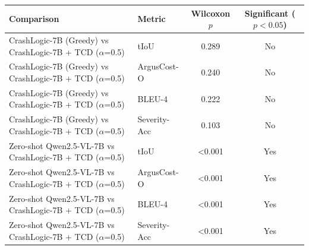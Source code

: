 \begin{tabular}{l l c c}
\toprule
Comparison & Metric & Wilcoxon $p$ & Significant ($p<0.05$) \\
\midrule
CrashLogic-7B (Greedy) vs CrashLogic-7B + TCD ($\alpha$=0.5) & tIoU & 0.289 & No \\
CrashLogic-7B (Greedy) vs CrashLogic-7B + TCD ($\alpha$=0.5) & ArgusCost-O & 0.240 & No \\
CrashLogic-7B (Greedy) vs CrashLogic-7B + TCD ($\alpha$=0.5) & BLEU-4 & 0.222 & No \\
CrashLogic-7B (Greedy) vs CrashLogic-7B + TCD ($\alpha$=0.5) & Severity-Acc & 0.103 & No \\
Zero-shot Qwen2.5-VL-7B vs CrashLogic-7B + TCD ($\alpha$=0.5) & tIoU & <0.001 & Yes \\
Zero-shot Qwen2.5-VL-7B vs CrashLogic-7B + TCD ($\alpha$=0.5) & ArgusCost-O & <0.001 & Yes \\
Zero-shot Qwen2.5-VL-7B vs CrashLogic-7B + TCD ($\alpha$=0.5) & BLEU-4 & <0.001 & Yes \\
Zero-shot Qwen2.5-VL-7B vs CrashLogic-7B + TCD ($\alpha$=0.5) & Severity-Acc & <0.001 & Yes \\
\bottomrule
\end{tabular}
